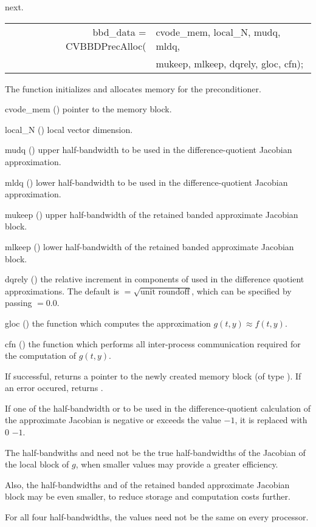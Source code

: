 next.
{
   \begin{tabular}[t]{@{}r@{}l@{}}
     bbd\_data = CVBBDPrecAlloc(&cvode\_mem, local\_N, mudq, mldq, \\
                                &mukeep, mlkeep, dqrely, gloc, cfn);
   \end{tabular}
}
{
  The function  initializes and allocates
  memory for the {\cvbbdpre} preconditioner.
}
{
  \begin{args}
  \item[cvode\_mem] ()
    pointer to the {\cvode} memory block.
  \item[local\_N] ()
    local vector dimension.
  \item[mudq] ()
    upper half-bandwidth to be used in the difference-quotient Jacobian approximation.
  \item[mldq] ()
    lower half-bandwidth to be used in the difference-quotient Jacobian approximation.
  \item[mukeep] ()
    upper half-bandwidth of the retained banded approximate Jacobian block.
  \item[mlkeep] ()
    lower half-bandwidth of the retained banded approximate Jacobian block.
  \item[dqrely] ()
    the relative increment in components of  used in the difference quotient
    approximations.  The default is $ = \sqrt{\text{unit roundoff}}$, which
    can be specified by passing $ = 0.0$.
  \item[gloc] ()
    the {\C} function which computes the approximation $g(t,y) \approx f(t,y)$. 
  \item[cfn] ()
    the {\C} function which performs all inter-process communication required for
    the computation of $g(t,y)$.
  \end{args}
}
{
  If successful,  returns a pointer to the newly created 
  {\cvbbdpre} memory block (of type ).
  If an error occured,  returns .
}
{
  If one of the half-bandwidth  or  to be used in the 
  difference-quotient calculation of the approximate Jacobian is negative or 
  exceeds the value $-1$, it is replaced with 0 $-1$.

  The half-bandwiths  and  need not be the true 
  half-bandwidths of the Jacobian of the local block of $g$,    
  when smaller values may provide a greater efficiency.       

  Also, the half-bandwidths  and  of the retained 
  banded approximate Jacobian block may be even smaller,      
  to reduce storage and computation costs further.            

  For all four half-bandwidths, the values need not be the    
  same on every processor.
}
